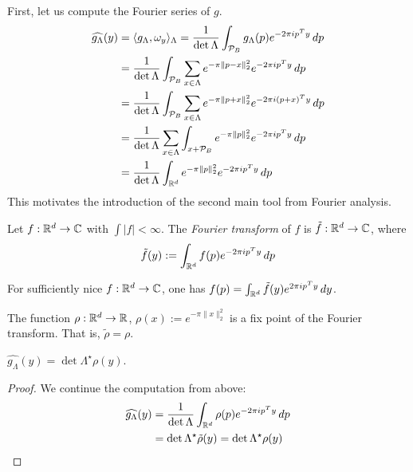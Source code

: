 First, let us compute the Fourier series of $g$.
\begin{align*}
  \widehat{g_\Lambda}(y) &= \langle g_\Lambda, \omega_y \rangle_\Lambda
    = \frac{1}{\det\Lambda} \int_{\mathcal{P}_B} g_\Lambda(p) e^{-2\pi i p^T y} \,dp \\
    &= \frac{1}{\det\Lambda} \int_{\mathcal{P}_B} \sum_{x \in \Lambda} e^{-\pi \|p - x\|_2^2} e^{-2\pi i p^T y} \,dp \\
    &= \frac{1}{\det\Lambda} \int_{\mathcal{P}_B} \sum_{x \in \Lambda} e^{-\pi \|p + x\|_2^2} e^{-2\pi i (p + x)^T y} \,dp \\
    &= \frac{1}{\det\Lambda} \sum_{x \in \Lambda} \int_{x + \mathcal{P}_B} e^{-\pi \|p\|_2^2} e^{-2\pi i p^T y} \,dp \\
    &= \frac{1}{\det\Lambda} \int_{\mathbb{R}^d} e^{-\pi \|p\|_2^2} e^{-2\pi i p^T y} \,dp
\end{align*}
This motivates the introduction of the second main tool from Fourier analysis.

\begin{definition}
  Let $f:\mathbb{R}^d \to \mathbb{C}$ with $\int |f| < \infty$.
  The \emph{Fourier transform} of $f$ is $\tilde f: \mathbb{R}^d \to \mathbb{C}$, where
  \[
    \tilde f(y) := \int_{\mathbb{R}^d} f(p) e^{-2\pi i p^Ty} \,dp
  \]
\end{definition}
\begin{theorem}
  For sufficiently nice $f: \mathbb{R}^d \to \mathbb{C}$, one has $f(p) = \int_{\mathbb{R}^d} \tilde f(y) e^{2\pi i p^Ty} \,dy$.
\end{theorem}

\begin{fact}
  The function $\rho: \mathbb{R}^d \to \mathbb{R}$, $\rho(x) := e^{-\pi \|x\|_2^2}$
  is a fix point of the Fourier transform.
  That is, $\tilde \rho = \rho$.
\end{fact}

\begin{lemma}
  \label{lemma:fourier-coeff-g}
  $\widehat{g_\Lambda}(y) = \det\Lambda^\star \rho(y)$.
\end{lemma}
\begin{proof}
  We continue the computation from above:
  \begin{align*}
    \widehat{g_\Lambda}(y) &= \frac{1}{\det\Lambda} \int_{\mathbb{R}^d} \rho(p) e^{-2\pi i p^T y} \,dp \\
      &= \det\Lambda^\star \tilde\rho(y) = \det\Lambda^\star \rho(y) \qedhere
  \end{align*}
\end{proof}

